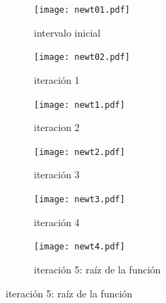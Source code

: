 \begin{figure}
	\centering
	\begin{subfigure}{0.4\textwidth}
		{\texttt{[image: newt01.pdf]}}
		\caption{intervalo inicial}
	\end{subfigure}
	\begin{subfigure}{0.4\textwidth}
		{\texttt{[image: newt02.pdf]}}
		\caption{iteración 1}
	\end{subfigure}	
	\begin{subfigure}{0.4\textwidth}
		{\texttt{[image: newt1.pdf]}}
		\caption{iteracion 2}
	\end{subfigure}
	\begin{subfigure}{0.4\textwidth}
		{\texttt{[image: newt2.pdf]}}
		\caption{iteración 3}
	\end{subfigure}
	\begin{subfigure}{0.4\textwidth}
		{\texttt{[image: newt3.pdf]}}
		\caption{iteración 4}
	\end{subfigure}
	\begin{subfigure}{0.4\textwidth}
		{\texttt{[image: newt4.pdf]}}
		\caption{iteración 5: raíz de la función}
	\end{subfigure}
	\label{fig:newton2}
\end{figure}
%
%





